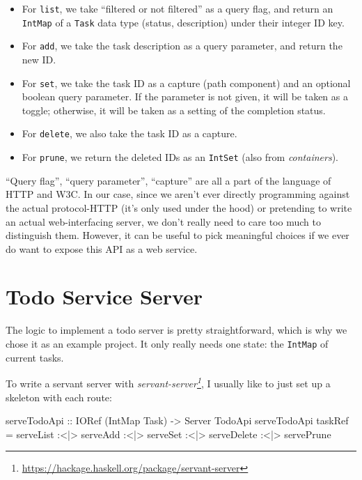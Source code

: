 \documentclass[]{article}
\newenvironment{Shaded}{}{}
\newcommand{\DataTypeTok}[1]{\textcolor[rgb]{0.56,0.13,0.00}{#1}}
\newcommand{\NormalTok}[1]{#1}
\newcommand{\OperatorTok}[1]{\textcolor[rgb]{0.40,0.40,0.40}{#1}}
\newcommand{\OtherTok}[1]{\textcolor[rgb]{0.00,0.44,0.13}{#1}}
\renewcommand{\href}[2]{#2\footnote{\url{#1}}}
\begin{document}
\begin{itemize}
\tightlist
\item
  For \texttt{list}, we take ``filtered or not filtered'' as a query flag, and
  return an \texttt{IntMap} of a \texttt{Task} data type (status, description)
  under their integer ID key.
\item
  For \texttt{add}, we take the task description as a query parameter, and
  return the new ID.
\item
  For \texttt{set}, we take the task ID as a capture (path component) and an
  optional boolean query parameter. If the parameter is not given, it will be
  taken as a toggle; otherwise, it will be taken as a setting of the completion
  status.
\item
  For \texttt{delete}, we also take the task ID as a capture.
\item
  For \texttt{prune}, we return the deleted IDs as an \texttt{IntSet} (also from
  \emph{containers}).
\end{itemize}

``Query flag'', ``query parameter'', ``capture'' are all a part of the language
of HTTP and W3C. In our case, since we aren't ever directly programming against
the actual protocol-HTTP (it's only used under the hood) or pretending to write
an actual web-interfacing server, we don't really need to care too much to
distinguish them. However, it can be useful to pick meaningful choices if we
ever do want to expose this API as a web service.

\section{Todo Service Server}\label{todo-service-server}

The logic to implement a todo server is pretty straightforward, which is why we
chose it as an example project. It only really needs one state: the
\texttt{IntMap} of current tasks.

To write a servant server with
\emph{\href{https://hackage.haskell.org/package/servant-server}{servant-server}},
I usually like to just set up a skeleton with each route:

\begin{Shaded}
\begin{Highlighting}[]
\OtherTok{serveTodoApi ::} \DataTypeTok{IORef}\NormalTok{ (}\DataTypeTok{IntMap} \DataTypeTok{Task}\NormalTok{) }\OtherTok{{-}\textgreater{}} \DataTypeTok{Server} \DataTypeTok{TodoApi}
\NormalTok{serveTodoApi taskRef }\OtherTok{=}\NormalTok{ serveList}
                  \OperatorTok{:\textless{}|\textgreater{}}\NormalTok{ serveAdd}
                  \OperatorTok{:\textless{}|\textgreater{}}\NormalTok{ serveSet}
                  \OperatorTok{:\textless{}|\textgreater{}}\NormalTok{ serveDelete}
                  \OperatorTok{:\textless{}|\textgreater{}}\NormalTok{ servePrune}
\end{Highlighting}
\end{Shaded}
\end{document}
